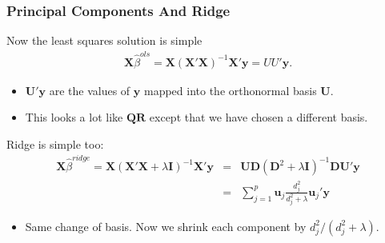 \documentclass[xcolor=pdftex,dvipsnames,table,mathserif,aspectratio=169]{beamer}
\begin{document}
\begin{frame}
\frametitle{Principal Components And Ridge}
Now the least squares solution is simple
\begin{eqnarray*}
\mathbf{X} \hat{\beta}^{ols} = \mathbf{X} (\mathbf{X}'\mathbf{X})^{-1} \mathbf{X}' \mathbf{y} = U U' \mathbf{y}.
\end{eqnarray*}
\begin{itemize}
\item $\mathbf{U}' \mathbf{y}$ are the values of $\mathbf{y}$ mapped into the orthonormal basis $\mathbf{U}$.
\item This looks a lot like $\mathbf{QR}$ except that we have chosen a different basis.
\end{itemize}
Ridge is simple too:
\begin{eqnarray*}
\mathbf{X} \hat{\beta}^{ridge} = \mathbf{X} (\mathbf{X}'\mathbf{X} + \lambda \mathbf{I})^{-1} \mathbf{X}' \mathbf{y} &=& \mathbf{U D} (\mathbf{D}^2 + \lambda \mathbf{I})^{-1} \mathbf{D} \mathbf{U}' \mathbf{y}\\
&=& \sum_{j=1}^p \mathbf{u}_j  \frac{d_j^2}{d_j^2 + \lambda} \mathbf{u}_j' \mathbf{y}
\end{eqnarray*}
\begin{itemize}
\item Same change of basis. Now we shrink each component by $d_j^2/(d_j^2 + \lambda)$.
\end{itemize}
\end{frame}
\end{document}
